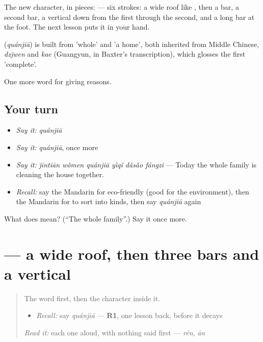 The new character, in pieces:  — six strokes: a wide roof like , then a bar, a second bar, a vertical down from the first through the second, and a long bar at the foot. The next lesson puts it in your hand.

\begin{cousinweb}
\textbf{} (\emph{quánjiā}) is built from  'whole' and  'a home', both inherited from Middle Chinese, \emph{dzjwen} and \emph{kae} (Guangyun, in Baxter's transcription), which glosses the first 'complete'.
\end{cousinweb}

\begin{grammarlens}[title={What you've built}]
One more word for giving reasons.
\end{grammarlens}

\subsection*{Your turn}
\begin{itemize}
\raggedright
  \item \emph{Say it:} \emph{quánjiā}
  \item \emph{Say it:} \emph{quánjiā}, once more
  \item \emph{Say it:} \emph{jīntiān wǒmen quánjiā yìqǐ dǎsǎo fángzi} — Today the whole family is cleaning the house together.
  \item \emph{Recall:} say the Mandarin for eco-friendly (good for the environment), then the Mandarin for to sort into kinds, then say \emph{quánjiā} again
\end{itemize}

\begin{tcolorbox}[breakable,colback=teal!4,colframe=teal!35!black,title={Before you move on}]
What does  mean? (\textquotedblleft{}The whole family\textquotedblright{}.) Say it once more.
\end{tcolorbox}
\section[\texorpdfstring{\zh{全} (quán)}{全 (quán)}]{ — a wide roof, then three bars and a vertical}

\label{lesson:ZH-W381-quan-whole}



\begin{quote}
The word first, then the character inside it.

\begin{itemize}
\raggedright
  \item \emph{Recall:} say \emph{quánjiā} — \textbf{R1}, one lesson back, before it decays
\end{itemize}

\begin{quote}
 
\end{quote}

\emph{Read it:} each one aloud, with nothing said first — \emph{rén}, \emph{ān}
\end{quote}

